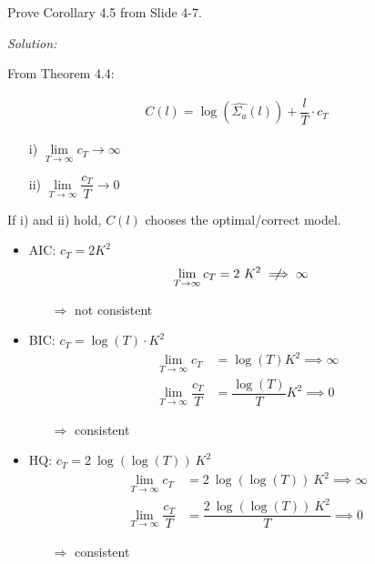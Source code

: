 \documentclass[12pt,a4paper]{article}
\begin{document}
Prove Corollary 4.5 from Slide 4-7.

\emph{Solution:}

From Theorem 4.4:

\begin{align*}
  C(l) = \log \left(\hat{\Sigma_a} (l) \right) + \dfrac{l}{T} \cdot c_T
\end{align*}

\begin{itemize}
  \item[i)] $\lim \limits_{T \rightarrow \infty} c_T \longrightarrow \infty$ 
  \item[ii)] $\lim \limits_{T \rightarrow \infty} \dfrac{c_T}{T} \longrightarrow 0$
\end{itemize}

If i) and ii) hold, \(C(l)\) chooses the optimal/correct model.

\begin{itemize}
  \item AIC: $c_T  = 2K^2$
  \begin{align*}
    \lim \limits_{T \rightarrow \infty} c_T & = 2 \ K^2 \centernot\implies \infty
  \end{align*}
  \begin{itemize}
    \item[$\Rightarrow$] not consistent
  \end{itemize}
  \item BIC: $c_T = \log(T)  \cdot K^2$
    \begin{align*}
    \lim \limits_{T \rightarrow \infty} c_T & = \log(T) K^2   \implies \infty \\
    \lim \limits_{T \rightarrow \infty} \dfrac{c_T}{T} & = \dfrac{\log(T)}{T} K^2 \implies 0 
  \end{align*}
  \begin{itemize}
    \item[$\Rightarrow$] consistent
  \end{itemize}
  \item HQ: $c_T = 2 \ \log(\log(T)) \ K^2$
  \begin{align*}
    \lim \limits_{T \rightarrow \infty} c_T & = 2 \ \log(\log(T)) \ K^2 \implies \infty  \\
    \lim \limits_{T \rightarrow \infty} \dfrac{c_T}{T} & = \dfrac{2 \ \log(\log(T)) \ K^2}{T} \implies 0 
  \end{align*}
  \begin{itemize}
    \item[$\Rightarrow$] consistent
  \end{itemize}
\end{itemize}
\end{document}
